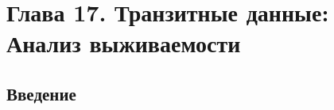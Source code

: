 

\chapter*{Глава 17. Транзитные данные: Анализ выживаемости}


\section{Введение}
\label{sec:17.1}

